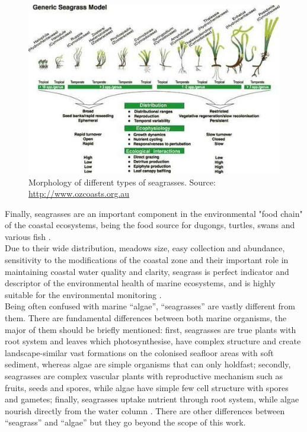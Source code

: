 \documentclass[10pt, a4paper]{article}
\begin{document}
\begin{figure}
\centering
	\includegraphics[scale=0.25]{Fig-1-3.jpg}
	\caption{Morphology of different types of seagrasses. Source: \url{http://www.ozcoasts.org.au}}
	\label{fig:3}
\end{figure}

Finally, seagrasses are an important component in the environmental "food chain" of the coastal
ecosystems, being the food source for dugongs, turtles, swans and various fish \cite{Cappo95}\label{Cappo95}.\\
Due to their wide distribution, meadows size, easy collection and abundance, sensitivity to the
modifications of the coastal zone and their important role in maintaining coastal water quality
and clarity, seagrass is perfect indicator and descriptor of the environmental health of marine
ecosystems, and is highly suitable for the environmental monitoring \cite{Pergent-Martini05}\label{Pergent-Martini05}.\\
Being often confused with marine “algae”, “seagrasses” are vastly different from them. There are
fundamental differences between both marine organisms, the major of them should be briefly
mentioned: first, seagrasses are true plants with root system and leaves which photosynthesise, have
complex structure and create landscape-similar vast formations on the colonised seafloor areas with
soft sediment, whereas algae are simple organisms that can only holdfast; secondly, seagrasses are
complex vascular plants with reproductive mechanism such as fruits, seeds and spores, while algae
have simple few cell structure with spores and gametes; finally, seagrasses uptake nutrient through
root system, while algae nourish directly from the water column \cite{Dixon05}\label{Dixon05}. There are other
differences between “seagrass” and “algae” but they go beyond the scope of this work.
\end{document}
